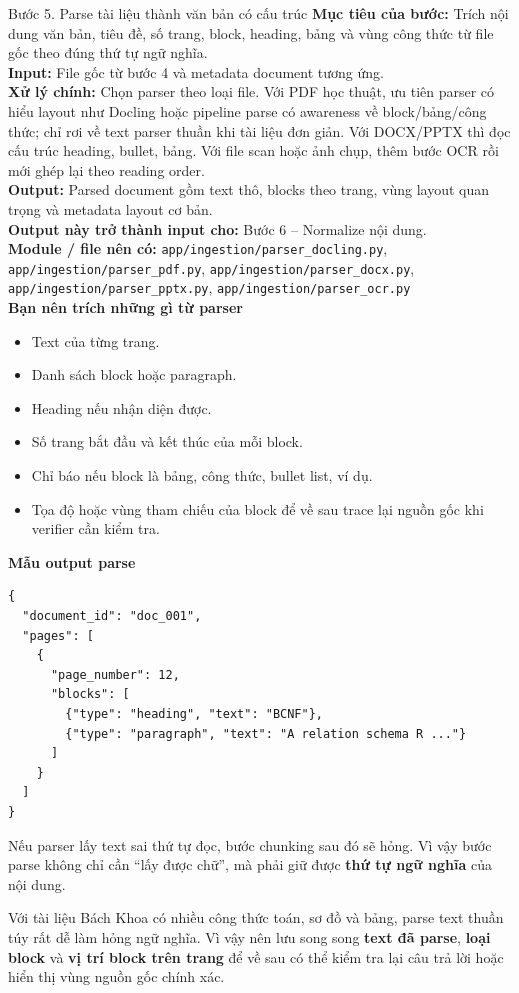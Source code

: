 \documentclass[12pt,a4paper]{article}
\newcommand{\stepgoal}[1]{\textbf{Mục tiêu của bước:} #1\\}
\newcommand{\stepinput}[1]{\textbf{Input:} #1\\}
\newcommand{\stepprocess}[1]{\textbf{Xử lý chính:} #1\\}
\newcommand{\stepoutput}[1]{\textbf{Output:} #1\\}
\newcommand{\stepnext}[1]{\textbf{Output này trở thành input cho:} #1\\}
\newcommand{\stepmodules}[1]{\textbf{Module / file nên có:} #1\\}
\begin{document}
\begin{stepbox}{Bước 5. Parse tài liệu thành văn bản có cấu trúc}
\stepgoal{Trích nội dung văn bản, tiêu đề, số trang, block, heading, bảng và vùng công thức từ file gốc theo đúng thứ tự ngữ nghĩa.}
\stepinput{File gốc từ bước 4 và metadata document tương ứng.}
\stepprocess{Chọn parser theo loại file. Với PDF học thuật, ưu tiên parser có hiểu layout như Docling hoặc pipeline parse có awareness về block/bảng/công thức; chỉ rơi về text parser thuần khi tài liệu đơn giản. Với DOCX/PPTX thì đọc cấu trúc heading, bullet, bảng. Với file scan hoặc ảnh chụp, thêm bước OCR rồi mới ghép lại theo reading order.}
\stepoutput{Parsed document gồm text thô, blocks theo trang, vùng layout quan trọng và metadata layout cơ bản.}
\stepnext{Bước 6 -- Normalize nội dung.}
\stepmodules{\texttt{app/ingestion/parser\_docling.py}, \texttt{app/ingestion/parser\_pdf.py}, \texttt{app/ingestion/parser\_docx.py}, \texttt{app/ingestion/parser\_pptx.py}, \texttt{app/ingestion/parser\_ocr.py}}

\textbf{Bạn nên trích những gì từ parser}
\begin{itemize}
    \item Text của từng trang.
    \item Danh sách block hoặc paragraph.
    \item Heading nếu nhận diện được.
    \item Số trang bắt đầu và kết thúc của mỗi block.
    \item Chỉ báo nếu block là bảng, công thức, bullet list, ví dụ.
    \item Tọa độ hoặc vùng tham chiếu của block để về sau trace lại nguồn gốc khi verifier cần kiểm tra.
\end{itemize}

\textbf{Mẫu output parse}
\begin{lstlisting}
{
  "document_id": "doc_001",
  "pages": [
    {
      "page_number": 12,
      "blocks": [
        {"type": "heading", "text": "BCNF"},
        {"type": "paragraph", "text": "A relation schema R ..."}
      ]
    }
  ]
}
\end{lstlisting}

\begin{warningbox}
Nếu parser lấy text sai thứ tự đọc, bước chunking sau đó sẽ hỏng. Vì vậy bước parse không chỉ cần ``lấy được chữ'', mà phải giữ được \textbf{thứ tự ngữ nghĩa} của nội dung.
\end{warningbox}

\begin{warningbox}
Với tài liệu Bách Khoa có nhiều công thức toán, sơ đồ và bảng, parse text thuần túy rất dễ làm hỏng ngữ nghĩa. Vì vậy nên lưu song song \textbf{text đã parse}, \textbf{loại block} và \textbf{vị trí block trên trang} để về sau có thể kiểm tra lại câu trả lời hoặc hiển thị vùng nguồn gốc chính xác.
\end{warningbox}
\end{stepbox}
\end{document}
